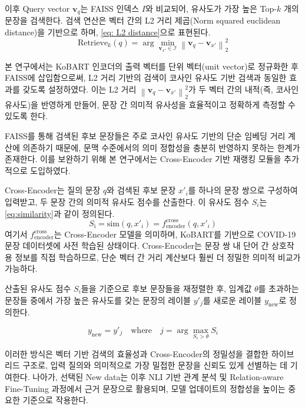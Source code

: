 \documentclass[a4paper,fleqn]{cas-sc}
\begin{document}
이후 Query vector \( \mathbf{v}_{q} \)는 FAISS 인덱스 \( I \)와 비교되어, 유사도가 가장 높은 Top-\( k \) 개의 문장을 검색한다. 
검색 연산은 벡터 간의 L2 거리 제곱(Norm squared euclidean distance)을 기반으로 하며, \cref{eq: L2 distance}으로 표현된다.
\begin{equation}
    \mathrm{Retrieve}_k(q) = \arg\min_{\mathbf{v}_{x'} \in \mathcal{I}} \left\| \mathbf{v}_q - \mathbf{v}_{x'} \right\|_2^2
    \label{eq: L2 distance}
\end{equation}

본 연구에서는 KoBART 인코더의 출력 벡터를 단위 벡터(unit vector)로 정규화한 후 FAISS에 삽입함으로써, L2 거리 기반의 검색이 코사인 유사도 기반 검색과 동일한 효과를 갖도록 설정하였다. 이는 L2 거리 \( \left\| \mathbf{v}_q - \mathbf{v}_{x'} \right\|_2^2 \)가 두 벡터 간의 내적(즉, 코사인 유사도)을 반영하게 만들어, 문장 간 의미적 유사성을 효율적이고 정확하게 측정할 수 있도록 한다.

FAISS를 통해 검색된 후보 문장들은 주로 코사인 유사도 기반의 단순 임베딩 거리 계산에 의존하기 때문에, 문맥 수준에서의 의미 정합성을 충분히 반영하지 못하는 한계가 존재한다. 이를 보완하기 위해 본 연구에서는 Cross-Encoder 기반 재랭킹 모듈을 추가적으로 도입하였다. 

Cross-Encoder는 질의 문장 \( q \)와 검색된 후보 문장 \( x'_i \)를 하나의 문장 쌍으로 구성하여 입력받고, 두 문장 간의 의미적 유사도 점수를 산출한다. 이 유사도 점수 \( S_i \)는 \cref{eq:similarity}과 같이 정의된다.
\begin{equation}
    S_{\text{i}} = \mathrm{sim}(q, x'_i) = f_{\text{encoder}}^{\text{cross}}(q, x'_i)
    \label{eq:similarity}
\end{equation}
\noindent
여기서 $f_{\text{encoder}}^{\text{cross}}$는 Cross-Encoder 모델을 의미하며, KoBART를 기반으로 COVID-19 문장 데이터셋에 사전 학습된 상태이다. Cross-Encoder는 문장 쌍 내 단어 간 상호작용 정보를 직접 학습하므로, 단순 벡터 간 거리 계산보다 훨씬 더 정밀한 의미적 비교가 가능하다.

산출된 유사도 점수 \( S_i \)들을 기준으로 후보 문장들을 재정렬한 후, 임계값 $\theta$를 초과하는 문장들 중에서 가장 높은 유사도를 갖는 문장의 레이블  $y'_j$​를 새로운 레이블 $y_{\text{new}}$로 정의한다.

\begin{equation}
    y_{\text{new}} = y'_{j} \quad \text{where} \quad j = \arg\max_{S_i > \theta} S_i
\end{equation}

이러한 방식은 벡터 기반 검색의 효율성과 Cross-Encoder의 정밀성을 결합한 하이브리드 구조로, 입력 질의와 의미적으로 가장 밀접한 문장을 신뢰도 있게 선별하는 데 기여한다. 나아가, 선택된 New data는 이후 NLI 기반 관계 분석 및 Relation-aware Fine-Tuning 과정에서 근거 문장으로 활용되며, 모델 업데이트의 정합성을 높이는 중요한 기준으로 작용한다.
\end{document}
